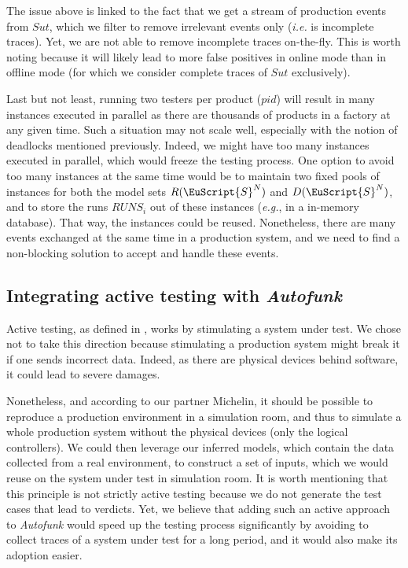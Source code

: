 The issue above is linked to the fact that we get a stream of
production events from $\mathit{Sut}$, which we filter to remove
irrelevant events only (\emph{i.e.} is incomplete traces). Yet,
we are not able to remove incomplete traces on-the-fly. This is
worth noting because it will likely lead to more false positives
in online mode than in offline mode (for which we consider
complete traces of $\mathit{Sut}$ exclusively).

Last but not least, running two testers per product ($pid$) will
result in many instances executed in parallel as there are
thousands of products in a factory at any given time. Such a
situation may not scale well, especially with the notion of
deadlocks mentioned previously. Indeed, we might have too many
instances executed in parallel, which would freeze the testing
process. One option to avoid too many instances at the same time
would be to maintain two fixed pools of instances for both the
model sets $R(\EuScript{S}^N)$ and $D(\EuScript{S}^N)$, and to
store the runs $RUNS_i$ out of these instances (\emph{e.g.}, in a
in-memory database). That way, the instances could be reused.
Nonetheless, there are many events exchanged at the same time in
a production system, and we need to find a non-blocking solution
to accept and handle these events.


\subsection{Integrating active testing with \emph{Autofunk}}
\label{sec:conclusion:testing:active}

Active testing, as defined in
,
works by stimulating a system under test. We chose not to take
this direction because stimulating a production system might
break it if one sends incorrect data. Indeed, as there are
physical devices behind software, it could lead to severe
damages.

Nonetheless, and according to our partner Michelin, it
should be possible to reproduce a production environment in a
simulation room, and thus to simulate a whole production system
without the physical devices (only the logical controllers). We
could then leverage our inferred models, which contain the data
collected from a real environment, to construct a set of inputs,
which we would reuse on the system under test in simulation room.
It is worth mentioning that this principle is not strictly active
testing because we do not generate the test cases that lead to
verdicts.  Yet, we believe that adding such an active approach to
\textit{Autofunk} would speed up the testing process
significantly by avoiding to collect traces of a system under
test for a long period, and it would also make its adoption
easier.

